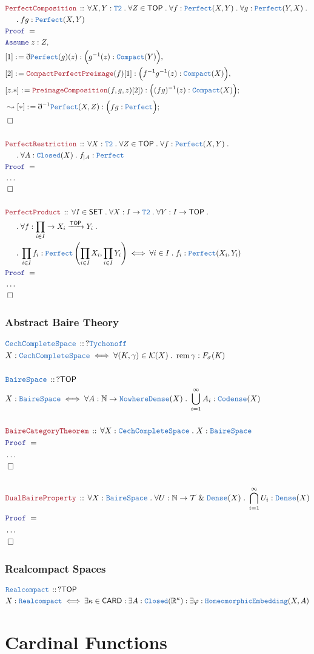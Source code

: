 \documentclass[12pt]{scrartcl}
\newcommand{\TYPE}[1]{\textcolor{NavyBlue}{\mathtt{#1}}}
\newcommand{\LOGIC}[1]{\textcolor{Blue}{\mathtt{#1}}}
\newcommand{\THM}[1]{\textcolor{Maroon}{\mathtt{#1}}}
\renewcommand{\.}{\; . \;}
\newcommand{\de}{: \kern 0.1pc =}
\newcommand{\Theorem}[2]{& \THM{#1} \, :: \, #2 \\ & \Proof = \\ }
\newcommand{\DeclareType}[2]{& \TYPE{#1} \, :: \, #2 \\}
\newcommand{\DefineType}[3]{& #1 : \TYPE{#2} \iff #3 \\}
\newcommand{\NewLine}{\\ & \kern 1pc}
\newcommand{\Page}[1]{ \begin{align*} #1 \end{align*}   }
\newcommand{ \bd }{ \ByDef }
\newcommand{\NoProof}{ & \ldots \\ \EndProof}
\renewcommand{\And}{\; \& \;}
\newcommand{\Reals}{\mathbb{R} }
\newcommand{\Nat}{\mathbb{N} }
\newcommand{\Arrow}{\xrightarrow}
\newcommand{\Say}[3]{& #1 \de #2 : #3, \\}
\newcommand{\Conclude}[3]{& #1 \de #2 : #3; \\}
\newcommand{\DeriveConclude}[3]{& \leadsto #1 \de #2 : #3 ; \\}
\newcommand{\Assume}[2]{& \LOGIC{Assume} \; #1 : #2, \\}
\newcommand{\QED}{\; \square}
\newcommand{\EndProof}{& \QED \\}
\newcommand{\ByDef}{\eth}
\newcommand{\Proof}{\LOGIC{Proof} \; }
\newcommand{\SET}{\mathsf{SET}}
\DeclareMathOperator{\rem}{rem}
\newcommand{\TOP}{\mathsf{TOP}}
\newcommand{\T}{\mathcal{T}}
\begin{document}
\Page{
	\Theorem{PerfectComposition}
	{
		\forall X,Y : \TYPE{T2} \.
		\forall Z \in \TOP \.
		\forall f : \TYPE{Perfect}(X,Y) \.
		\forall g : \TYPE{Perfect}(Y,X) \. \NewLine \.
		fg : \TYPE{Perfect}(X,Y) 
	}
	\Assume{z}{Z}
	\Say{[1]}{\bd \TYPE{Perfect}(g)(z)}{\Big( g^{-1}(z) : \TYPE{Compact}(Y) \Big)}
	\Say{[2]}{\THM{CompactPerfectPreimage}(f)[1]}{\Big( f^{-1}g^{-1}(z) : \TYPE{Compact}(X) \Big)}
	\Conclude{[z.*]}{\THM{PreimageComposition}(f,g,z)[2])}{\Big( (fg)^{-1}(z) : \TYPE{Compact}(X) \Big)}
	\DeriveConclude{[*]}{\bd^{-1}\TYPE{Perfect}(X,Z)}{\Big( fg : \TYPE{Perfect} \Big)}
	\EndProof
	\\
	\Theorem{PerfectRestriction}
	{
		\forall X : \TYPE{T2} \.
		\forall Z \in \TOP \.
		\forall f : \TYPE{Perfect}(X,Y) \. \NewLine \.
		\forall A : \TYPE{Closed}(X)   \.
		f_{|A} : \TYPE{Perfect}                           
	}
	\NoProof
	\\
	\Theorem{PerfectProduct}
	{
		\forall I \in \SET \.
		\forall X : I \to\TYPE{T2} \.
		\forall Y : I \to \TOP \. \NewLine \.
		\forall f : \prod_{i \in I} \to X_i \Arrow{\TOP} Y_i \. \NewLine \. 
		\prod_{i \in I} f_i : \TYPE{Perfect}\left(\prod_{i \in I} X_i, \prod_{i \in I} Y_i\right) 
		\iff
		\forall i \in I \. f_i : \TYPE{Perfect}(X_i,Y_i)
	}
	\NoProof
}
\newpage

\newpage
\subsubsection{Abstract Baire Theory}
\Page{
	\DeclareType{CechCompleteSpace}{?\TYPE{Tychonoff}}
	\DefineType{X}{CechCompleteSpace}{\forall (K,\gamma) \in \mathcal{K}(X) \. \rem \gamma : F_\sigma(K)}
	\\
	\DeclareType{BaireSpace}{?\TOP}
	\DefineType{X}{BaireSpace}{\forall A : \Nat \to \TYPE{NowhereDense}(X) \. \bigcup^\infty_{i=1} A_i : \TYPE{Codense}(X)}
	\\
	\Theorem{BaireCategoryTheorem}{\forall X : \TYPE{CechCompleteSpace} \. X : \TYPE{BaireSpace}  }
	\NoProof
	\\
	\Theorem{DualBaireProperty}{\forall X : \TYPE{BaireSpace} \. \forall U : \Nat \to \T \And \TYPE{Dense}(X) \. \bigcap^\infty_{i=1} U_i : \TYPE{Dense}(X)}
	\NoProof
}
\newpage
\subsubsection{Realcompact Spaces}
\Page{
	\DeclareType{Realcompact}{?\TOP}
	\DefineType{X}{Realcompact}{\exists \kappa \in \mathsf{CARD} : \exists A : \TYPE{Closed}(\Reals^\kappa) : \exists \varphi : \TYPE{HomeomorphicEmbedding}(X,A)}
}
\newpage
\section{Cardinal Functions}
\end{document}
